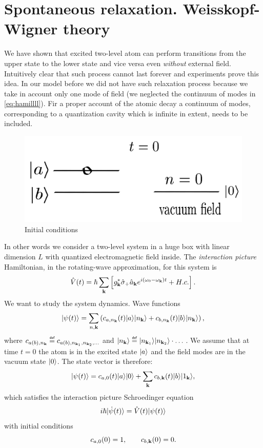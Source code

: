 \section{Spontaneous relaxation. Weisskopf-Wigner theory}

We have shown that excited two-level atom can perform transitions from the upper state to the lower state and vice versa even \textit{without} external field. Intuitively clear that such process cannot last forever and experiments prove this idea. In our model before we did not have such relaxation process because we take in account only one mode of field (we neglected the continuum of modes in \eqref{eq:hamillll}). Fir a proper account of the atomic decay a continuum of modes, corresponding to a quantization cavity which is infinite in extent, needs to be included.

\begin{figure}[h!]
	\centering
	\includegraphics[width=0.5\linewidth]{fig/L7/1}
	\caption{Initial conditions}
	\label{fig:1}
\end{figure}

In other words we consider a two-level system in a huge box with linear dimension $L$ with quantized electromagnetic field inside.
The \textit{interaction picture} Hamiltonian, in the rotating-wave approximation, for this system is
\begin{equation}
	\hat{V}(t) = \hbar \sum_{\mathbf{k}} \left[ g_{\mathbf{k}}^* \hat{\sigma}_+ \hat{a}_{\mathbf{k}} e^{i(\omega_0 - \omega_{\mathbf{k}})t} + H.c. \right].
\end{equation}
We want to study the system dynamics. Wave functions
\begin{equation}
\lvert\psi(t)\rangle = \sum_{n, \mathbf{k}} \left( c_{a, n_{\mathbf{k}}}(t) \lvert a\rangle \lvert n_{\mathbf{k}}\rangle + c_{b, n_{\mathbf{k}}}(t) \lvert b\rangle \lvert n_{\mathbf{k}}\rangle \right),
\end{equation}
where $c_{a(b),n_{\kv}} \myeq c_{a(b), n_{\kv_1}, n_{\kv_2}, \dots}$ and $\ket{n_{\kv}} \myeq \ket{n_{\kv_1}} \ket{n_{\kv_2}} \cdot \dots$. We assume that at time $t=0$ the atom is in the excited state $\lvert a\rangle$ and the field modes are in the vacuum state $\lvert0\rangle$. The state vector is therefore: 
\begin{equation}
	\lvert\psi(t)\rangle = c_{a,0}(t) \lvert a\rangle\lvert0\rangle + \sum_{\mathbf{k}} c_{b, \mathbf{k}}(t) \lvert b\rangle\lvert1_{\mathbf{k}}\rangle, 
\end{equation}
which satisfies the interaction picture Schroedinger equation 
\begin{equation}
i \hbar \lvert\dot{\psi}(t)\rangle = \hat{V}(t) \lvert\psi(t)\rangle
\end{equation}
with initial conditions
\begin{equation}
	c_{a,0}(0) = 1, \qquad c_{b,\mathbf{k}}(0) = 0.
\end{equation}

